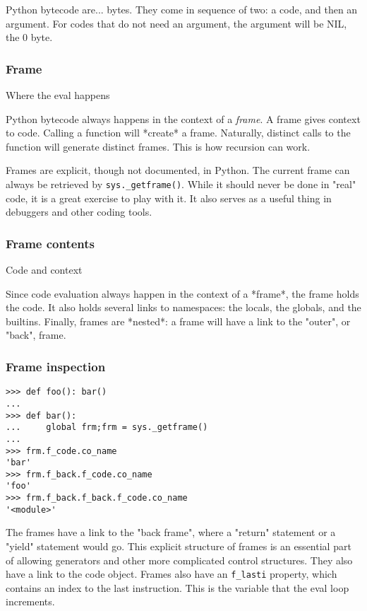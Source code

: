 Python bytecode are...
bytes.
They come in sequence of two:
a code,
and then an argument.
For codes that do not need an argument,
the argument will be NIL,
the 0 byte.

\begin{frame}
\frametitle{Frame}

Where the eval happens
\end{frame}

Python bytecode always happens in the context of a
{\em frame}.
A frame gives context to code.
Calling a function will
*create*
a frame.
Naturally,
distinct calls to the function
will generate distinct frames.
This is how recursion can work.

Frames are explicit,
though not documented,
in Python.
The current frame can always be retrieved by
\verb|sys._getframe()|.
While it should never be done in
"real"
code,
it is a great exercise to play with it.
It also serves as a useful thing in debuggers
and other coding tools.

\begin{frame}
\frametitle{Frame contents}

Code and context
\end{frame}

Since code evaluation always happen in the context of a
*frame*,
the frame holds the code.
It also holds several links to namespaces:
the locals, the globals, and the builtins.
Finally,
frames are
*nested*:
a frame will have a link to the "outer",
or "back",
frame.



\begin{frame}
\frametitle{Frame inspection}

\begin{lstlisting}
>>> def foo(): bar()
... 
>>> def bar():
...     global frm;frm = sys._getframe()
... 
>>> frm.f_code.co_name
'bar'
>>> frm.f_back.f_code.co_name
'foo'
>>> frm.f_back.f_back.f_code.co_name
'<module>'
\end{lstlisting}
\end{frame}

The frames have a link to the "back frame",
where a "return" statement or a "yield" statement would go.
This explicit structure of frames is an essential part of allowing
generators and other more complicated control structures.
They also have a link to the code object.
Frames also have an \verb|f_lasti| property,
which contains an index to the last instruction.
This is the variable that the eval loop increments.

